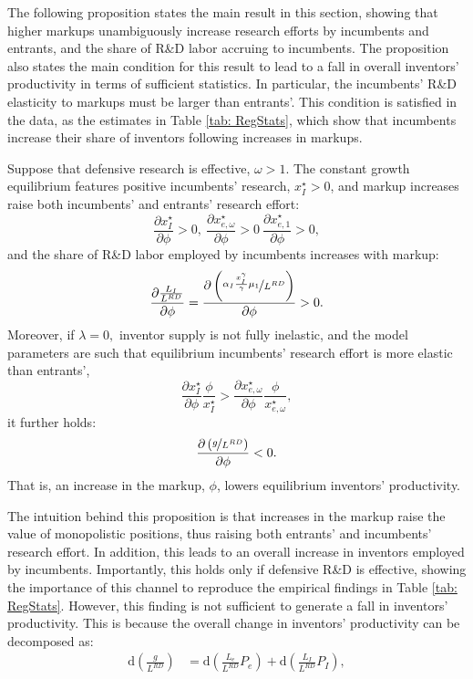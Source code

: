 The following proposition states the main result in this section,
showing that higher markups unambiguously increase research efforts
by incumbents and entrants, and the share of R\&D labor accruing to
incumbents. The proposition also states the main condition for this
result to lead to a fall in overall inventors' productivity in terms
of sufficient statistics. In particular, the incumbents' R\&D elasticity
to markups must be larger than entrants'. This condition is satisfied
in the data, as the estimates in Table \ref{tab: RegStats}, which
show that incumbents increase their share of inventors following increases
in markups. 
\begin{prop}
\label{prop: partialEq}Suppose that defensive research is effective,
$\omega>1$. The constant growth equilibrium features positive incumbents'
research, $x_{I}^{\star}>0$, and markup increases raise both incumbents'
and entrants' research effort:
\[
\frac{\partial x_{I}^{\star}}{\partial\phi}>0,\ \frac{\partial x_{e,\omega}^{\star}}{\partial\phi}>0\ \frac{\partial x_{e,1}^{\star}}{\partial\phi}>0,
\]
and the share of R\&D labor employed by incumbents increases with
markup:
\[
\frac{\partial\frac{L_{I}}{L^{RD}}}{\partial\phi}=\frac{\partial\left(\nicefrac{\alpha_{I}\frac{x_{I}^{\gamma}}{\gamma}\mu_{1}}{L^{RD}}\right)}{\partial\phi}>0.
\]
Moreover, if $\lambda=0,$ inventor supply is not fully inelastic,
and the model parameters are such that equilibrium incumbents' research
effort is more elastic than entrants', 
\[
\frac{\partial x_{I}^{\star}}{\partial\phi}\frac{\phi}{x_{I}^{\star}}>\frac{\partial x_{e,\omega}^{\star}}{\partial\phi}\frac{\phi}{x_{e,\omega}^{\star}},
\]
it further holds:
\[
\frac{\partial\left(\nicefrac{g}{L^{RD}}\right)}{\partial\phi}<0.
\]
That is, an increase in the markup, $\phi$, lowers equilibrium inventors'
productivity. 
\end{prop}
The intuition behind this proposition is that increases in the markup
raise the value of monopolistic positions, thus raising both entrants'
and incumbents' research effort. In addition, this leads to an overall
increase in inventors employed by incumbents. Importantly, this holds
only if defensive R\&D is effective, showing the importance of this
channel to reproduce the empirical findings in Table \ref{tab: RegStats}.
However, this finding is not sufficient to generate a fall in inventors'
productivity. This is because the overall change in inventors' productivity
can be decomposed as:
\begin{align*}
\mathrm{d}\left(\frac{g}{L^{RD}}\right) & =\mathrm{d}\left(\frac{L_{e}}{L^{RD}}P_{e}\right)+\mathrm{d}\left(\frac{L_{I}}{L^{RD}}P_{I}\right),
\end{align*}
